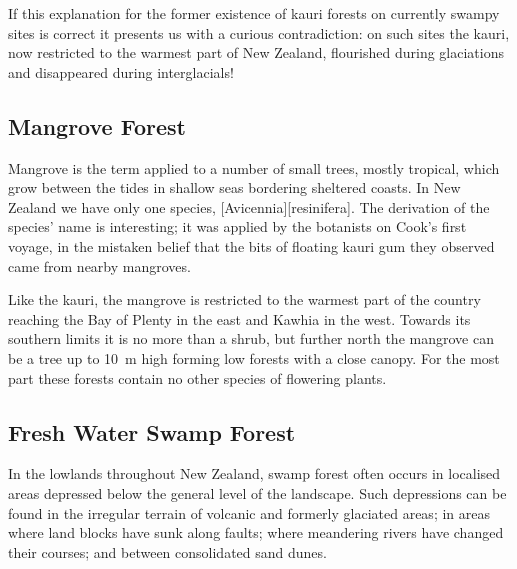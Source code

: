 If this explanation for the former existence of kauri forests on currently swampy sites is correct it presents us with a curious contradiction: on such sites the kauri, now restricted to the warmest part of New Zealand, flourished during glaciations and disappeared during interglacials!

\subsection{Mangrove Forest}

Mangrove is the term applied to a number of small trees, mostly tropical, which grow between the tides in shallow seas bordering sheltered coasts.
In New Zealand we have only one species, [Avicennia][resinifera].
The derivation of the species' name is interesting; it was applied by the botanists on Cook's first voyage, in the mistaken belief that the bits of floating kauri gum they observed came from nearby mangroves.

Like the kauri, the mangrove is restricted to the warmest part of the country reaching the Bay of Plenty in the east and Kawhia in the west.
Towards its southern limits it is no more than a shrub, but further north the mangrove can be a tree up to \SI{10}{\metre} high forming low forests with a close canopy.
For the most part these forests contain no other species of flowering plants.

\subsection{Fresh Water Swamp Forest}

In the lowlands throughout New Zealand, swamp forest often occurs in localised areas depressed below the general level of the landscape.
Such depressions can be found in the irregular terrain of volcanic and formerly glaciated areas; in areas where land blocks have sunk along faults; where meandering rivers have changed their courses; and between consolidated sand dunes.


